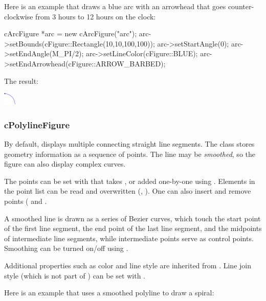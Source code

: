 Here is an example that draws a blue arc with an arrowhead that goes
counter-clockwise from 3 hours to 12 hours on the clock:

\begin{cpp}
cArcFigure *arc = new cArcFigure("arc");
arc->setBounds(cFigure::Rectangle(10,10,100,100));
arc->setStartAngle(0);
arc->setEndAngle(M_PI/2);
arc->setLineColor(cFigure::BLUE);
arc->setEndArrowhead(cFigure::ARROW_BARBED);
\end{cpp}


The result:

\begin{center}
\includegraphics[scale=4.0]{figures/figure-arc}
\end{center}


\subsubsection{cPolylineFigure}

By default,  displays multiple connecting straight
line segments. The class stores geometry information as a sequence of
points. The line may be \textit{smoothed}, so the figure can also display
complex curves.

The points can be set with  that takes ,
or added one-by-one using . Elements in the point list can be
read and overwritten (, ). One can also
insert and remove points ( and .

A smoothed line is drawn as a series of Bezier curves, which touch the
start point of the first line segment, the end point of the last line
segment, and the midpoints of intermediate line segments, while
intermediate points serve as control points. Smoothing can be turned on/off
using .

Additional properties such as color and line style are inherited from
. Line join style (which is not part of
) can be set with .

Here is an example that uses a smoothed polyline to draw a spiral:

